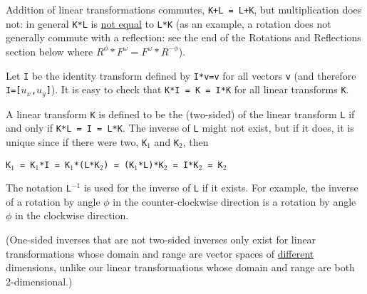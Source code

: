 \documentclass[12pt]{article}
\begin{document}
Addition of linear transformations commutes,
{\tt K+L = L+K}, but multiplication does not:
in general {\tt K*L} is \underline{not equal} to {\tt L*K}
(as an example, a rotation does not generally commute with
a reflection: see the end of the Rotations and Reflections
section below where $R^\phi*F^\omega = F^\omega*R^{-\phi}$).

Let {\tt I} be the identity transform defined by
{\tt I*v=v} for all vectors {\tt v}  (and therefore {\tt I=[$u_x$,$u_y$]}).
It is easy to check that {\tt K*I = K = I*K} for all linear transforms
{\tt K}.

A linear transform {\tt K} is defined to be the (two-sided) 
of the linear transform {\tt L} if and only if {\tt K*L = I = L*K}.
The inverse of {\tt L} might not exist, but if it does, it is unique
since if there were two, {\tt K$_1$} and {\tt K$_2$}, then \\
\centerline{\tt K$_1$ = K$_1$*I = K$_1$*(L*K$_2$)
                      = (K$_1$*L)*K$_2$ = I*K$_2$ = K$_2$}
The notation {\tt L$^{-1}$} is used for the inverse of {\tt L} if it
exists.  For example, the inverse of a rotation by angle $\phi$ in the
counter-clockwise direction is a rotation by angle $\phi$ in the
clockwise direction.

(One-sided inverses that are not two-sided inverses only exist for
linear transformations whose domain and range are vector spaces of
\underline{different} dimensions, unlike our linear transformations
whose domain and range are both 2-dimensional.)



\newpage
\end{document}
